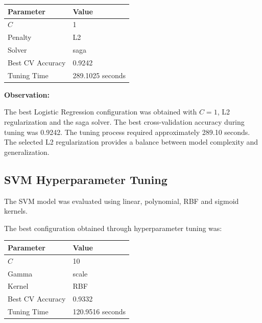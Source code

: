 \documentclass[12pt,a4paper]{article}
\begin{document}
\begin{longtable}{|p{6cm}|p{8cm}|}
\hline
\textbf{Parameter} & \textbf{Value} \\ \hline

$C$ & 1 \\ \hline

Penalty & L2 \\ \hline

Solver & saga \\ \hline

Best CV Accuracy & 0.9242 \\ \hline

Tuning Time & 289.1025 seconds \\ \hline

\end{longtable}

\textbf{Observation:}

The best Logistic Regression configuration was obtained with
$C=1$, L2 regularization and the saga solver. The best cross-validation
accuracy during tuning was 0.9242. The tuning process required
approximately 289.10 seconds. The selected L2 regularization provides
a balance between model complexity and generalization.


\subsection{SVM Hyperparameter Tuning}

The SVM model was evaluated using linear, polynomial, RBF and sigmoid
kernels.

The best configuration obtained through hyperparameter tuning was:

\begin{longtable}{|p{6cm}|p{8cm}|}
\hline
\textbf{Parameter} & \textbf{Value} \\ \hline

$C$ & 10 \\ \hline

Gamma & scale \\ \hline

Kernel & RBF \\ \hline

Best CV Accuracy & 0.9332 \\ \hline

Tuning Time & 120.9516 seconds \\ \hline

\end{longtable}
\end{document}
